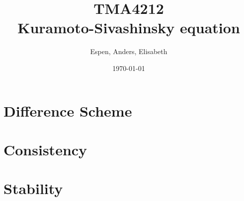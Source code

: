 \documentclass[16pt]{article}
\title{TMA4212 \\ Kuramoto-Sivashinsky equation}
\author{Espen, Anders, Elisabeth}
\date{\today}
\begin{document}
\huge

\section*{Difference Scheme}


\section*{Consistency}


\section*{Stability}

\end{document}
